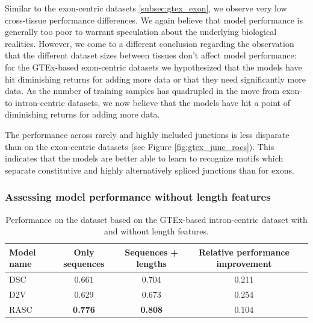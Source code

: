 Similar to the exon-centric datasets \ref{subsec:gtex_exon}, we observe very low cross-tissue performance differences. We again believe that model performance is generally too poor to warrant speculation about the underlying biological realities. However, we come to a different conclusion regarding the observation that the different dataset sizes between tissues don't affect model performance:
for the GTEx-based exon-centric datasets we hypothesized that the models have hit diminishing returns for adding more data or that they need significantly more data. As the number of training samples has quadrupled in the move from exon- to intron-centric datasets, we now believe that the models have hit a point of diminishing returns for adding more data. 




The performance across rarely and highly included junctions is less disparate than on the exon-centric datasets (see Figure \ref{fig:gtex_junc_rocs}). This indicates that the models are better able to learn to recognize motifs which separate constitutive and highly alternatively spliced junctions than for exons.

\subsubsection{Assessing model performance without length features}

\begin{table}[h!]
	\centering
	\begin{tabular}{| l | c | c | c| c} 
		\hline
		Model name & Only sequences & Sequences + lengths & Relative performance improvement\\
		\hline
		DSC & 0.661 & 0.704 & 0.211\\
		D2V & 0.629 & 0.673 & 0.254\\
		RASC & \textbf{0.776} & \textbf{0.808} & 0.104\\
		\hline
	\end{tabular}
	\caption{Performance on the dataset based on the GTEx-based intron-centric dataset with and without length features. 
	}
	\label{table:gtex_junc_nolens}
\end{table}

